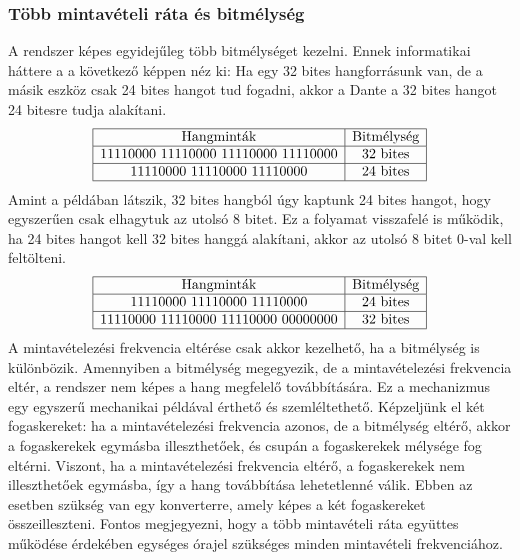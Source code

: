 \subsubsection{Több mintavételi ráta és bitmélység}
A rendszer képes egyidejűleg több bitmélységet kezelni. Ennek informatikai háttere a
a következő képpen néz ki:
Ha egy 32 bites hangforrásunk van, de a másik eszköz
csak 24 bites hangot tud fogadni, akkor a Dante a 32 bites hangot 24 bitesre tudja 
alakítani.
\begin{align*}
	\begin{array}{|c|c|}
	\hline
	\text{Hangminták} & \text{Bitmélység} \\
	\hline
	\text{11110000 11110000 11110000 11110000} & \text{32 bites} \\
	\hline
	\text{11110000 11110000 11110000} & \text{24 bites} \\
	\hline
	\end{array}
\end{align*}
Amint a példában látszik, 32 bites hangból úgy kaptunk 24 bites hangot, 
hogy egyszerűen csak elhagytuk az utolsó 8 bitet. Ez a folyamat visszafelé is működik,
ha 24 bites hangot kell 32 bites hanggá alakítani, akkor az utolsó 8 bitet 0-val kell feltölteni.
\begin{align*}
	\begin{array}{|c|c|}
	\hline
	\text{Hangminták} & \text{Bitmélység} \\
	\hline
	\text{11110000 11110000 11110000} & \text{24 bites} \\
	\hline
	\text{11110000 11110000 11110000 00000000} & \text{32 bites} \\
	\hline
	\end{array}
\end{align*}
A mintavételezési frekvencia eltérése csak akkor kezelhető, ha a bitmélység is különbözik. 
Amennyiben a bitmélység megegyezik, de a mintavételezési frekvencia eltér, a rendszer nem 
képes a hang megfelelő továbbítására. Ez a mechanizmus egy egyszerű mechanikai példával 
érthető és szemléltethető. Képzeljünk el két fogaskereket: ha a mintavételezési frekvencia 
azonos, de a bitmélység eltérő, akkor a fogaskerekek egymásba illeszthetőek, és csupán a 
fogaskerekek mélysége fog eltérni. Viszont, ha a mintavételezési frekvencia eltérő, a 
fogaskerekek nem illeszthetőek egymásba, így a hang továbbítása lehetetlenné válik. 
Ebben az esetben szükség van egy konverterre, amely képes a két fogaskereket összeilleszteni. 
Fontos megjegyezni, hogy a több mintavételi ráta együttes működése érdekében egységes 
órajel szükséges minden mintavételi frekvenciához.
